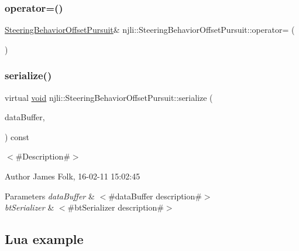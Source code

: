 \subsubsection{\texorpdfstring{operator=()}{operator=()}}
{\footnotesize\ttfamily \mbox{\hyperlink{classnjli_1_1_steering_behavior_offset_pursuit}{Steering\+Behavior\+Offset\+Pursuit}}\& njli\+::\+Steering\+Behavior\+Offset\+Pursuit\+::operator= (\begin{DoxyParamCaption}\item[{const \mbox{\hyperlink{classnjli_1_1_steering_behavior_offset_pursuit}{Steering\+Behavior\+Offset\+Pursuit}} \&}]{ }\end{DoxyParamCaption})\hspace{0.3cm}{\ttfamily [protected]}}

\mbox{\label{classnjli_1_1_steering_behavior_offset_pursuit_a25cd6f2c3bbc1098c019477a27e836e3}} 
\subsubsection{\texorpdfstring{serialize()}{serialize()}}
{\footnotesize\ttfamily virtual \mbox{\hyperlink{_thread_8h_af1e856da2e658414cb2456cb6f7ebc66}{void}} njli\+::\+Steering\+Behavior\+Offset\+Pursuit\+::serialize (\begin{DoxyParamCaption}\item[{\mbox{\hyperlink{_thread_8h_af1e856da2e658414cb2456cb6f7ebc66}{void}} $\ast$}]{data\+Buffer,  }\item[{bt\+Serializer $\ast$}]{ }\end{DoxyParamCaption}) const\hspace{0.3cm}{\ttfamily [virtual]}}



$<$\#\+Description\#$>$ 

\begin{DoxyAuthor}{Author}
James Folk, 16-\/02-\/11 15\+:02\+:45
\end{DoxyAuthor}

\begin{DoxyParams}{Parameters}
{\em data\+Buffer} & $<$\#data\+Buffer description\#$>$ \\
\hline
{\em bt\+Serializer} & $<$\#bt\+Serializer description\#$>$\\
\hline
\end{DoxyParams}
\hypertarget{classnjli_1_1_steering_behavior_wander_ex1}{}\subsection{Lua example}\label{classnjli_1_1_steering_behavior_wander_ex1}

